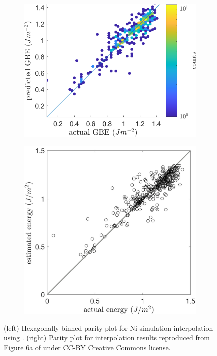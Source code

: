 \documentclass[preprint,12pt]{elsarticle}
\begin{document}
	\begin{figure}
		\centering
		\begin{subfigure}[b]{0.5\textwidth}
			\centering
			\includegraphics[width=\textwidth]{figures/olmsted-Ni-loocv.png}
			\label{fig:our-loocv}
			\hfill
		\end{subfigure}
		\begin{subfigure}[b]{0.4\textwidth}
			\centering
			\includegraphics[width=\textwidth]{figures/ChesserFigure.jpg}
			\label{fig:chesser-loocv}
		\end{subfigure}
		\caption{(left) Hexagonally binned parity plot for Ni simulation  interpolation using . (right) Parity plot for  interpolation results reproduced from Figure 6a of \citet{chesserLearningGrainBoundary2020} under CC-BY Creative Commons license. }
		\label{fig:olmsted-Ni-loocv}
	\end{figure}
	
\end{document}

